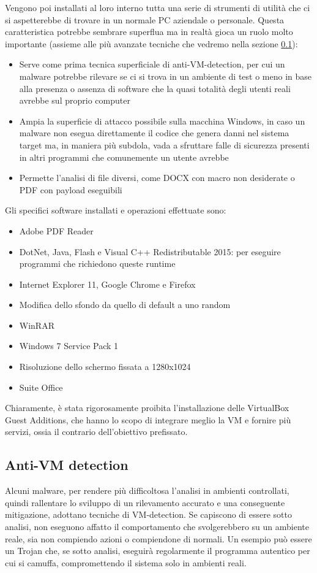 Vengono poi installati al loro interno tutta una serie di strumenti di utilità che ci si aspetterebbe di trovare in un normale PC aziendale o personale. Questa caratteristica potrebbe sembrare superflua ma in realtà gioca un ruolo molto importante (assieme alle più avanzate tecniche che vedremo nella sezione \ref{chap:dynamic-anti-vm-detection}):
\begin{itemize}
    \item Serve come prima tecnica superficiale di anti-VM-detection, per cui un malware potrebbe rilevare se ci si trova in un ambiente di test o meno in base alla presenza o assenza di software che la quasi totalità degli utenti reali avrebbe sul proprio computer
    \item Ampia la superficie di attacco possibile sulla macchina Windows, in caso un malware non esegua direttamente il codice che genera danni nel sistema target ma, in maniera più subdola, vada a sfruttare falle di sicurezza presenti in altri programmi che comunemente un utente avrebbe
    \item Permette l'analisi di file diversi, come DOCX con macro non desiderate o PDF con payload eseguibili
\end{itemize}

Gli specifici software installati e operazioni effettuate sono:
\begin{itemize}
    \item Adobe PDF Reader
    \item DotNet, Java, Flash e Visual C++ Redistributable 2015: per eseguire programmi che richiedono queste runtime
    \item Internet Explorer 11, Google Chrome e Firefox
    \item Modifica dello sfondo da quello di default a uno random
    \item WinRAR
    \item Windows 7 Service Pack 1
    \item Risoluzione dello schermo fissata a 1280x1024
    \item Suite Office
\end{itemize}

Chiaramente, è stata rigorosamente proibita l'installazione delle VirtualBox Guest Additions, che hanno lo scopo di integrare meglio la VM e fornire più servizi, ossia il contrario dell'obiettivo prefissato.

\subsection{Anti-VM detection}
\label{chap:dynamic-anti-vm-detection}
Alcuni malware, per rendere più difficoltosa l'analisi in ambienti controllati, quindi rallentare lo sviluppo di un rilevamento accurato e una conseguente mitigazione, adottano tecniche di VM-detection. Se capiscono di essere sotto analisi, non eseguono affatto il comportamento che svolgerebbero su un ambiente reale, sia non compiendo azioni o compiendone di normali. Un esempio può essere un Trojan che, se sotto analisi, eseguirà regolarmente il programma autentico per cui si camuffa, compromettendo il sistema solo in ambienti reali.


